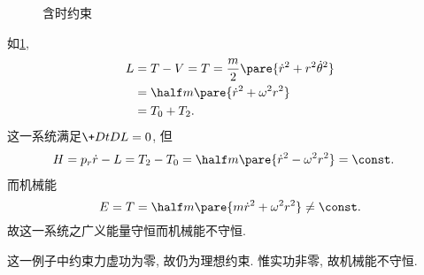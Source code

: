 \documentclass{ctexart}
\begin{document}
\begin{figure}
    \centering
    \caption{含时约束}
    \label{fig:含时约束}
\end{figure}
\begin{sample}
    \begin{ex}
        如\cref{fig:含时约束},
        \begin{align*}
            L &= T-V = T = \frac{m}{2}\pare{\dot{r}^2 + r^2\dot{\theta}^2} \\
            &= \half m \pare{\dot{r}^2 + \omega^2 r^2} \\
            &= T_0 + T_2.
        \end{align*}
        这一系统满足$\displaystyle \+DtDL = 0$, 但
        \begin{align*}
            H &= p_r\dot{r} - L = T_2 - T_0 = \half m\pare{\dot{r}^2 - \omega^2r^2} = \const.
        \end{align*}
        而机械能
        \[ E = T = \half m\pare{m\dot{r}^2 + \omega^2 r^2} \neq \const. \]
        故这一系统之广义能量守恒而机械能不守恒.
    \end{ex}
    \begin{remark}
        这一例子中约束力虚功为零, 故仍为理想约束. 惟实功非零, 故机械能不守恒.
    \end{remark}
\end{sample}
\end{document}
